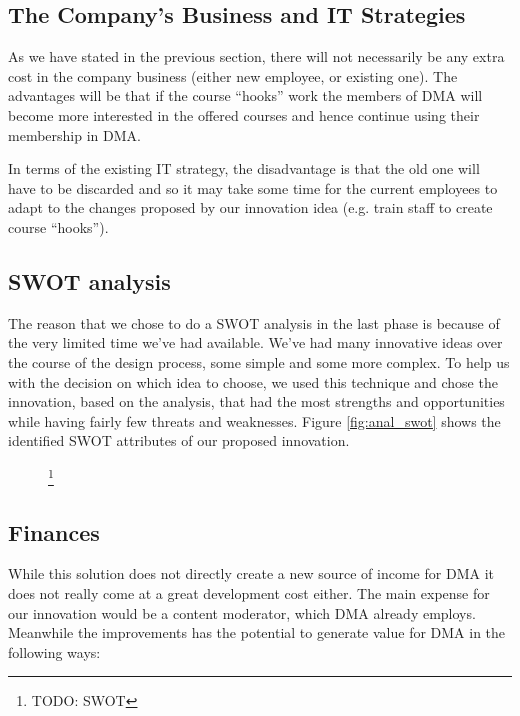 \subsection{The Company’s Business and IT Strategies}
As we have stated in the previous section, there will not necessarily be any extra cost in the company business (either new employee, or existing one). The advantages will be that if the course “hooks” work the members of DMA will become more interested in the offered courses and hence continue using their membership in DMA.

In terms of the existing IT strategy, the disadvantage is that the old one will have to be discarded and so it may take some time for the current employees to adapt to the changes proposed by our innovation idea (e.g. train staff to create course “hooks”). 


\subsection{SWOT analysis}
The reason that we chose to do a SWOT analysis in the last phase is because of the very limited time we’ve had available. We’ve had many innovative ideas over the course of the design process, some simple and some more complex. To help us with the decision on which idea to choose, we used this technique and chose the innovation, based on the analysis, that had the most strengths and opportunities while having fairly few threats and weaknesses. Figure \ref{fig:anal_swot} shows the identified SWOT attributes of our proposed innovation. 

\begin{figure}
\footnote{TODO: SWOT}
\end{figure}

\subsection{Finances}
While this solution does not directly create a new source of income for DMA it does not really come at a great development cost either. The main expense for our innovation would be a content moderator, which DMA already employs. Meanwhile the improvements has the potential to generate value for DMA in the following ways:

